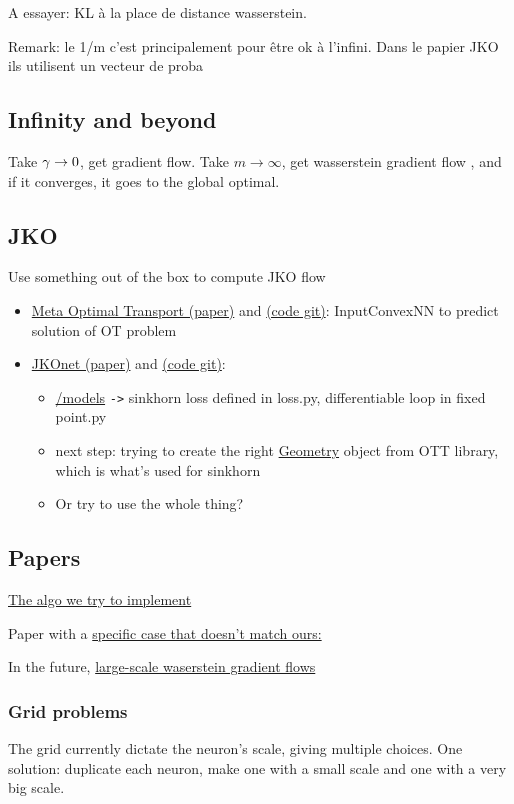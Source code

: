 A essayer: KL à la place de distance wasserstein.

Remark: le 1/m c'est principalement pour être ok à l'infini. Dans le papier JKO \citep{carlierConvergenceEntropicSchemes2017} ils utilisent un vecteur de proba

\subsection{Infinity and beyond}

Take $\gamma \to 0$, get gradient flow. Take $m \to \infty$, get wasserstein gradient flow \citep{bachGradientDescentInfinitely2021}, and if it converges, it goes to the global optimal.

\subsection{JKO}

Use something out of the box to compute JKO flow

\begin{itemize}
	\item \href{https://arxiv.org/pdf/2206.05262.pdf}{Meta Optimal Transport (paper)} and \href{https://github.com/facebookresearch/meta-ot}{(code git)}: InputConvexNN to predict solution of OT problem
	\item \href{https://arxiv.org/pdf/2106.06345.pdf}{JKOnet (paper)} and \href{https://github.com/bunnech/jkonet}{(code git)}:
		\begin{itemize}
			\item \href{https://github.com/bunnech/jkonet/tree/main/jkonet/models}{/models} \verb|->| sinkhorn loss defined in loss.py, differentiable loop in fixed point.py
			\item next step: trying to create the right \href{https://ott-jax.readthedocs.io/en/latest/_autosummary/ott.geometry.geometry.Geometry.html#ott.geometry.geometry.Geometry}{Geometry} object from OTT library, which is what's used for sinkhorn
			\item Or try to use the whole thing?
		\end{itemize}
\end{itemize}

\subsection{Papers}

\href{https://arxiv.org/pdf/1502.06216.pdf}{The algo we try to implement}

Paper with a \href{https://arxiv.org/pdf/1512.02783.pdf}{specific case that doesn't match ours:} 

In the future, \href{https://arxiv.org/pdf/2106.00736.pdf}{large-scale waserstein gradient flows}

\subsubsection{Grid problems}

The grid currently dictate the neuron's scale, giving multiple choices. One solution: duplicate each neuron, make one with a small scale and one with a very big scale.



